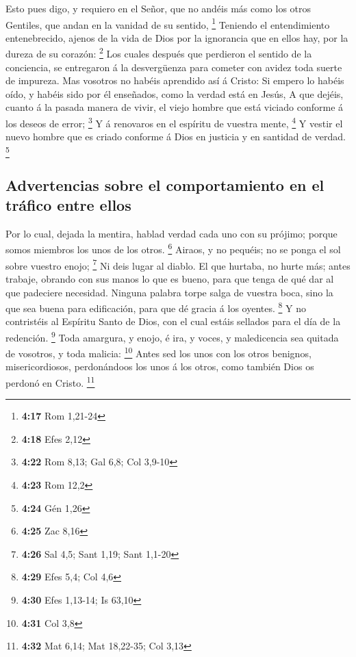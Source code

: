  Esto pues digo, y requiero en el Señor, que no andéis
más como los otros Gentiles, que andan en la vanidad de su sentido,
\footnote{\textbf{4:17} Rom 1,21-24}  Teniendo el
entendimiento entenebrecido, ajenos de la vida de Dios por la ignorancia
que en ellos hay, por la dureza de su corazón: \footnote{\textbf{4:18}
  Efes 2,12}  Los cuales después que perdieron el sentido
de la conciencia, se entregaron á la desvergüenza para cometer con
avidez toda suerte de impureza.  Mas vosotros no habéis
aprendido así á Cristo:  Si empero lo habéis oído, y
habéis sido por él enseñados, como la verdad está en Jesús,
 A que dejéis, cuanto á la pasada manera de vivir, el
viejo hombre que está viciado conforme á los deseos de error;
\footnote{\textbf{4:22} Rom 8,13; Gal 6,8; Col 3,9-10}  Y
á renovaros en el espíritu de vuestra mente, \footnote{\textbf{4:23} Rom
  12,2}  Y vestir el nuevo hombre que es criado conforme
á Dios en justicia y en santidad de verdad. \footnote{\textbf{4:24} Gén
  1,26}

\hypertarget{advertencias-sobre-el-comportamiento-en-el-truxe1fico-entre-ellos}{%
\subsection{Advertencias sobre el comportamiento en el tráfico entre
ellos}\label{advertencias-sobre-el-comportamiento-en-el-truxe1fico-entre-ellos}}

 Por lo cual, dejada la mentira, hablad verdad cada uno
con su prójimo; porque somos miembros los unos de los otros. \footnote{\textbf{4:25}
  Zac 8,16}  Airaos, y no pequéis; no se ponga el sol
sobre vuestro enojo; \footnote{\textbf{4:26} Sal 4,5; Sant 1,19; Sant
  1,1-20}  Ni deis lugar al diablo.  El
que hurtaba, no hurte más; antes trabaje, obrando con sus manos lo que
es bueno, para que tenga de qué dar al que padeciere necesidad.
 Ninguna palabra torpe salga de vuestra boca, sino la que
sea buena para edificación, para que dé gracia á los oyentes.
\footnote{\textbf{4:29} Efes 5,4; Col 4,6}  Y no
contristéis al Espíritu Santo de Dios, con el cual estáis sellados para
el día de la redención. \footnote{\textbf{4:30} Efes 1,13-14; Is 63,10}
 Toda amargura, y enojo, é ira, y voces, y maledicencia
sea quitada de vosotros, y toda malicia: \footnote{\textbf{4:31} Col 3,8}
 Antes sed los unos con los otros benignos,
misericordiosos, perdonándoos los unos á los otros, como también Dios os
perdonó en Cristo. \footnote{\textbf{4:32} Mat 6,14; Mat 18,22-35; Col
  3,13}

